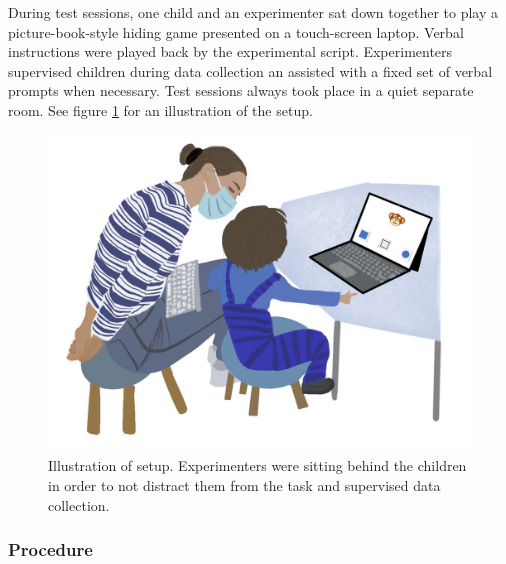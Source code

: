\documentclass[
  man]{apa6}
\begin{document}
During test sessions, one child and an experimenter sat down together to play a picture-book-style hiding game presented on a touch-screen laptop. Verbal instructions were played back by the experimental script. Experimenters supervised children during data collection an assisted with a fixed set of verbal prompts when necessary. Test sessions always took place in a quiet separate room. See figure \ref{fig:figure-setup} for an illustration of the setup.



\begin{figure}

{\centering \includegraphics{../illustrations/Symlit_Rep_Setup_fromarrows} 

}

\caption{Illustration of setup. Experimenters were sitting behind the children in order to not distract them from the task and supervised data collection.}\label{fig:figure-setup}
\end{figure}

\subsubsection{Procedure}\label{procedure}
\end{document}
